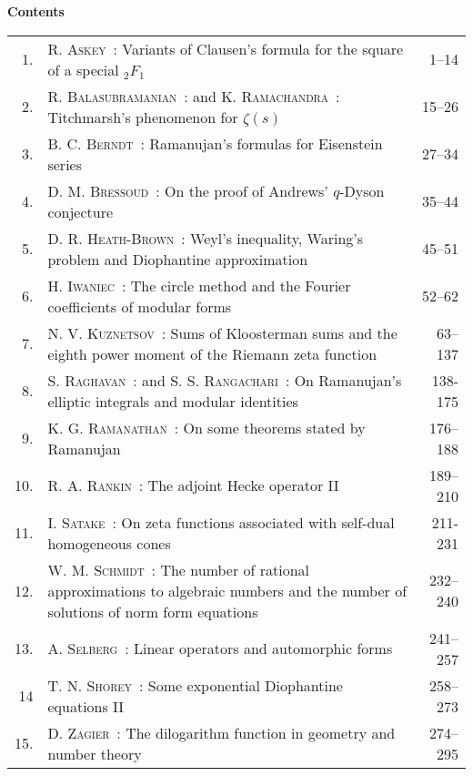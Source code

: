 
\thispagestyle{empty}

\noindent
{\bf\huge Contents}

\vskip 1cm


\noindent
\renewcommand{\arraystretch}{1.7}
\begin{longtable}[l]{r>{\raggedright}p{8cm}r}
1. & \textsc{R. Askey~:}  Variants of Clausen's formula for the square of a special ${}_2F_1$ & 1--14 \\
2. & \textsc{R. Balasubramanian~:} and \textsc{K. Ramachandra~:}  Titchmarsh's phenomenon for $\zeta(s)$ & 15--26 \\
3. & \textsc{B. C. Berndt~:}  Ramanujan's formulas for Eisenstein series & 27--34 \\
4. & \textsc{D. M. Bressoud~:}  On the proof of Andrews' $q$-Dyson conjecture & 35--44 \\
5. & \textsc{D. R. Heath-Brown~:}  Weyl's inequality, Waring's problem and Diophantine approximation & 45--51 \\
6. & \textsc{H. Iwaniec~:}  The circle method and the Fourier coefficients of modular forms & 52--62 \\
7. & \textsc{N. V. Kuznetsov~:}  Sums of Kloosterman sums and the eighth power moment of the Riemann zeta function & 63--137 \\
8. & \textsc{S. Raghavan~:}  and \textsc{S. S. Rangachari~:}  On Ramanujan's elliptic integrals and modular identities & 138-175 \\
9. & \textsc{K. G. Ramanathan~:}  On some theorems stated by Ramanujan & 176--188 \\
10. & \textsc{R. A. Rankin~:}  The adjoint Hecke operator II & 189--210 \\  
11. & \textsc{I. Satake~:}  On zeta functions associated with self-dual homogeneous cones & 211-231 \\
12. & \textsc{W. M. Schmidt~:} The number of rational approximations to algebraic numbers and the number of solutions of norm form equations & 232--240 \\
13. & \textsc{A. Selberg~:}  Linear operators and automorphic forms & 241--257 \\
14 & \textsc{T. N. Shorey~:}  Some exponential Diophantine equations II & 258--273 \\
15. & \textsc{D. Zagier~:}  The dilogarithm function in geometry and number theory & 274--295 \\
\end{longtable}

\thispagestyle{empty}

